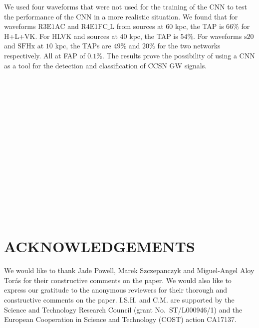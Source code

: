 \documentclass[aps,twocolumn,showpacs,groupedaddress, nofootinbib]{revtex4}  %
\begin{document}
We used four waveforms that were not used for the training of the \ac{CNN} to
test the performance of the \ac{CNN} in a more realistic situation. We found
that for waveforms $\text{R3E1AC}$ and $\text{R4E1FC\_L}$ from sources at
$60$ kpc, the \ac{TAP} is $66\%$ for H+L+VK.
For HLVK and sources at $40$ kpc, the \ac{TAP} is $54\%$.
For waveforms $\text{s}20$ and $\text{SFHx}$ at $10$ kpc, the \acp{TAP} are $49\%$ and
$20\%$ for the two networks respectively. All at \ac{FAP} of $0.1\%$. 
The results prove the possibility of
using a \ac{CNN} as a tool for the detection and classification of \ac{CCSN}
\ac{GW} signals.
\\
\\
\\
\\
\\
\\
\\
\\
\\
\\
\\
\\
\\
\\
\\
\\
\section{ACKNOWLEDGEMENTS}
We would like to thank Jade Powell, Marek Szczepanczyk and Miguel-Angel Aloy Torás for their 
constructive comments on the paper.
We would also like to express our gratitude to the anonymous reviewers for their 
thorough and constructive comments on the paper.
I.S.H. and C.M. are supported by the Science and Technology Research Council
(grant No.~ST/L000946/1) and the European Cooperation in Science and
Technology (COST) action CA17137. 


%
\end{document}
